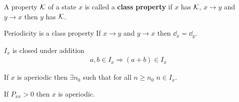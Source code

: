 \documentclass[12pt,a4paper]{article}
\begin{document}
\begin{defn}
A property $\cal K$ of a state $x$ is called a \textbf{class property} if 
$x$ has $\cal K$, $x\to y$ and $y\to x$ then $y$ has $\cal K$. 
\end{defn}

\begin{lemma}{Periodicity is a class property}
If $x\to y$ and $y\to x$ then $\dd_x = \dd_y$.
\end{lemma}

\begin{lemma}{$I_x$ is closed under addition}
\begin{align*}
a,b\in I_x \Rightarrow (a+b)\in I_x
\end{align*}
\end{lemma}

\begin{lemma}{}
If $x$ is aperiodic then $\exists n_0$ such that for all $n\geq n_0$ $n\in I_x$. 
\end{lemma}

\begin{lemma}{}
If $P_{xx} > 0$ then $x$ is aperiodic.
\end{lemma}
\end{document}
